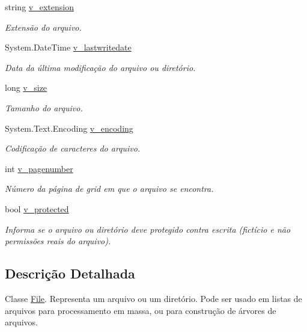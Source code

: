 \begin{DoxyCompactItemize}
string \hyperlink{classSpartacus_1_1Utils_1_1File_a8a2d38a5f48438d53858e6800313d45c}{v\+\_\+extension}
\begin{DoxyCompactList}\small\item\em Extensão do arquivo. \end{DoxyCompactList}\item 
System.\+Date\+Time \hyperlink{classSpartacus_1_1Utils_1_1File_a3ff14b7ecbf2e2b5bb41f44943a18c83}{v\+\_\+lastwritedate}
\begin{DoxyCompactList}\small\item\em Data da última modificação do arquivo ou diretório. \end{DoxyCompactList}\item 
long \hyperlink{classSpartacus_1_1Utils_1_1File_a174b72e731e64d86db44c6d781011137}{v\+\_\+size}
\begin{DoxyCompactList}\small\item\em Tamanho do arquivo. \end{DoxyCompactList}\item 
System.\+Text.\+Encoding \hyperlink{classSpartacus_1_1Utils_1_1File_af7a6fb35b3396d68a88c111ef642ab4f}{v\+\_\+encoding}
\begin{DoxyCompactList}\small\item\em Codificação de caracteres do arquivo. \end{DoxyCompactList}\item 
int \hyperlink{classSpartacus_1_1Utils_1_1File_a02b1d6f67f6718b43807e120244fcf4f}{v\+\_\+pagenumber}
\begin{DoxyCompactList}\small\item\em Número da página de grid em que o arquivo se encontra. \end{DoxyCompactList}\item 
bool \hyperlink{classSpartacus_1_1Utils_1_1File_a5ede704209b7aa9ed88b414629228bd9}{v\+\_\+protected}
\begin{DoxyCompactList}\small\item\em Informa se o arquivo ou diretório deve protegido contra escrita (fictício e não permissões reais do arquivo). \end{DoxyCompactList}\end{DoxyCompactItemize}


\subsection{Descrição Detalhada}
Classe \hyperlink{classSpartacus_1_1Utils_1_1File}{File}. Representa um arquivo ou um diretório. Pode ser usado em listas de arquivos para processamento em massa, ou para construção de árvores de arquivos. 



